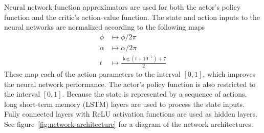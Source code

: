 \documentclass{article}
\begin{document}
Neural network function approximators are used for both the actor's policy function and the critic's action-value function. The state and action inputs to the neural networks are normalized according to the following maps
\begin{align}
    \phi &\mapsto \phi / 2\pi \\
    \alpha &\mapsto \alpha / 2\pi \\
    t      &\mapsto \frac{\log(t + 10^{-7}) + 7}{2}
\end{align}
These map each of the action parameters to the interval $[0,1]$, which improves the neural network performance. The actor's policy function is also restricted to the interval $[0,1]$.
Because the state is represented by a sequence of actions, long short-term memory (LSTM) layers are used to process the state inputs\cite{lstm}. Fully connected layers with ReLU activation functions are used as hidden layers. See figure~\ref{fig:network-architecture} for a diagram of the network architectures.
\end{document}
